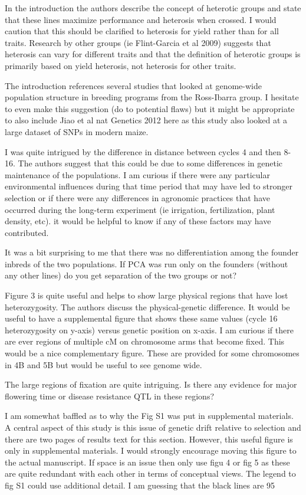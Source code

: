 \documentclass[onecolumn,oneside,letterpaper]{article}
\begin{document}
In the introduction the authors describe the concept of heterotic groups and 
state that these lines maximize performance and heterosis when crossed.  I would 
caution that this should be clarified to heterosis for yield rather than for all 
traits. Research by other groups (ie Flint-Garcia et al 2009) suggests that 
heterosis can vary for different traits and that the definition of heterotic 
groups is primarily based on yield heterosis, not heterosis for other traits.  

The introduction references several studies that looked at genome-wide 
population structure in breeding programs from the Ross-Ibarra group.  I 
hesitate to even make this suggestion (do to potential flaws) but it might be 
appropriate to also include Jiao et al nat Genetics 2012 here as this study also 
looked at a large dataset of SNPs in modern maize. 

I was quite intrigued by the difference in distance between cycles 4 and then 8-
16.  The authors suggest that this could be due to some differences in genetic 
maintenance of the populations.  I am curious if there were any particular 
environmental influences during that time period that may have led to stronger 
selection or if there were any differences in agronomic practices that have 
occurred during the long-term experiment (ie irrigation, fertilization, plant 
density, etc).  it would be helpful to know if any of these factors may have 
contributed.

It was a bit surprising to me that there was no differentiation among the 
founder inbreds of the two populations.  If PCA was run only on the founders 
(without any other lines) do you get separation of the two groups or not?

Figure 3 is quite useful and helps to show large physical regions that have lost 
heterozygosity.  The authors discuss the physical-genetic difference.  It would 
be useful to have a supplemental figure that shows these same values (cycle 16 
heterozygosity on y-axis) versus genetic position on x-axis.  I am curious if 
there are ever regions of multiple cM on chromosome arms that become fixed.  
This would be a nice complementary figure.  These are provided for some 
chromosomes in 4B and 5B but would be useful to see genome wide.  

The large regions of fixation are quite intriguing.  Is there any evidence for 
major flowering time or disease resistance QTL in these regions?

I am somewhat baffled as to why the Fig S1 was put in supplemental materials.  A 
central aspect of this study is this issue of genetic drift relative to 
selection and there are two pages of results text for this section.  However, 
this useful figure is only in supplemental materials.  I would strongly 
encourage moving this figure to the actual manuscript.  If space is an issue 
then only use figu 4 or fig 5 as these are quite redundant with each other in 
terms of conceptual views. 
The legend to fig S1 could use additional detail.  I am guessing that the black 
lines are 95%
\end{document}
